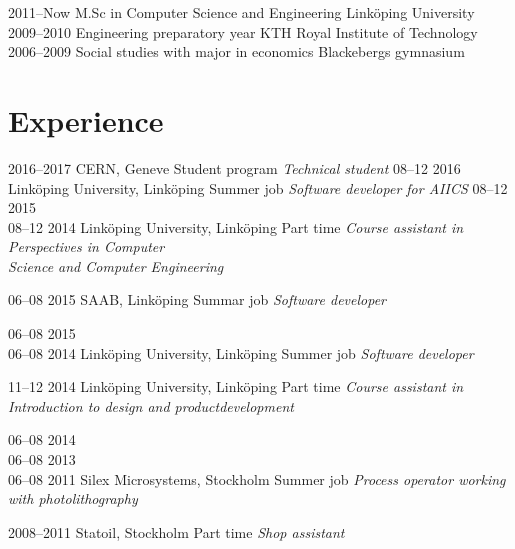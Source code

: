 \documentclass[]{cv-style}          %
\begin{document}
\begin{entrylist}
  \entry
    {2011–Now}
    {M.Sc in Computer Science and Engineering}
    {Linköping University}
    { }
  \entry
    {2009–2010}
    {Engineering preparatory year}
    {KTH Royal Institute of Technology}
    {}
  \entry
    {2006–2009}
    {Social studies with major in economics}
    {Blackebergs gymnasium}
    {}
\end{entrylist}

\section{Experience}

\begin{entrylist}
         \entry
    {2016–2017}
    {CERN, Geneve}
    {Student program}
    {\emph{Technical student}}
         \entry
    {08–12 2016}
    {Linköping University, Linköping}
    {Summer job}
    {\emph{Software developer for AIICS}}
         \entry
    {08–12 2015\\08–12 2014}
    {Linköping University, Linköping}
    {Part time}
    {\emph{Course assistant in Perspectives in Computer\\ Science and Computer Engineering}}
  
  \entry
    {06–08 2015}
    {SAAB, Linköping}
    {Summar job}
    {\emph{Software developer}}
    
   \entry
    {06–08 2015\\06–08 2014 }
    {Linköping University, Linköping}
    {Summer job}
    {\emph{Software developer}}
    
        \entry
    {11–12 2014}
    {Linköping University, Linköping}
    {Part time}
    {\emph{
    Course assistant in Introduction to design and productdevelopment}}
    
  \entry
    {06–08 2014\\06–08 2013\\06–08 2011 }
    {Silex Microsystems, Stockholm}
    {Summer job}
    {\emph{Process operator working with photolithography}}
    
    
    
  \entry
    {2008–2011}
    {Statoil, Stockholm}
    {Part time}
    {\emph{Shop assistant}}

\end{entrylist}
\end{document}
